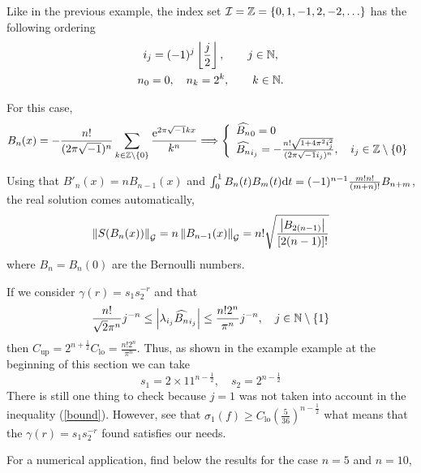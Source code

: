 \documentclass[final]{elsarticle}
\theoremstyle{definition}
\theoremstyle{remark}
\DeclareMathOperator{\up}{up}
\DeclareMathOperator{\lo}{lo}
\begin{document}
Like in the previous example, the index set $\ci=\integers=\{0,1,-1,2,-2,\ldots\}$ has the following ordering
\begin{gather*}
i_j=(-1)^{j}\left\lfloor\frac{j}{2}\right\rfloor,\qquad j\in\naturals,\\
n_0=0,\quad n_k=2^k, \qquad k\in\naturals.
\end{gather*}

For this case,
\begin{equation*}
B_n(x)=-\frac{n!}{(2\pi\sqrt{-1})^n}\sum_{k\in\integers\setminus\{0\}}\frac{\me^{2\pi\sqrt{-1}kx}}{k^n}\Longrightarrow
\left\{\begin{array}{l}
\widehat{B_n}_0=0 \\
\widehat{B_n}_{i_j}=-\frac{n!\sqrt{1+4 \pi^2 i_j^2}}{(2\pi\sqrt{-1}i_j)^n},\quad i_j\in\integers\setminus\{0\}
\end{array}\right.
\end{equation*}

Using that $B'_n(x)=nB_{n-1}(x)$ and $\int_0^1B_n(t)B_m(t)\dif t=(-1)^{n-1}\frac{m!n!}{(m+n)!}B_{n+m}$, the real solution comes automatically,
\begin{equation*}
\norm[\cg]{S(B_n(x))}=n\norm[\cg]{B_{n-1}(x)}=n!\sqrt{\frac{\abs{B_{2(n-1)}}}{[2(n-1)]!}}
\end{equation*}
where $B_n=B_n(0)$ are the Bernoulli numbers.

If we consider $\gamma(r)=s_1s_2^{-r}$ and that
\begin{equation}\label{bound}
\frac{n!}{\sqrt{2}\pi^n}j^{-n} \le \abs{\lambda_{i_j}\widehat{B_n}_{i_j}} \le \frac{n!2^n}{\pi^n}j^{-n},\quad j\in\naturals\setminus\{1\}
\end{equation}
then $C_{\up}=2^{n+\frac{1}{2}}C_{\lo}=\frac{n!2^n}{\pi^n}$. Thus, as shown in the example example at the beginning of this section we can take
\begin{equation*}
s_1=2\times11^{n-\frac{1}{2}},\quad s_2=2^{n-\frac{1}{2}}
\end{equation*}
There is still one thing to check because $j=1$ was not taken into account in the inequality (\ref{bound}). However, see that $\sigma_1(f) \ge C_{\lo}\left(\frac{5}{36}\right)^{n-\frac{1}{2}}$ what means that the $\gamma(r)=s_1s_2^{-r}$ found satisfies our needs.

For a numerical application, find below the results for the case $n=5$ and $n=10$,
\end{document}
